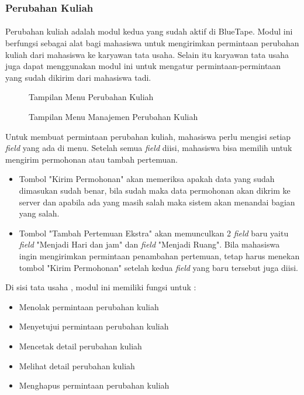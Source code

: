 \subsubsection{Perubahan Kuliah}
\paragraph{} Perubahan kuliah adalah modul kedua yang sudah aktif di BlueTape. Modul ini berfungsi sebagai alat bagi mahasiswa untuk mengirimkan permintaan perubahan kuliah dari mahasiswa ke karyawan tata usaha. Selain itu karyawan tata usaha juga dapat menggunakan modul ini untuk mengatur permintaan-permintaan yang sudah dikirim dari mahasiswa tadi. 
\begin{figure} [H]
	\centering  
	\caption[Tampilan Menu Perubahan Kuliah]{Tampilan Menu Perubahan Kuliah} 
	\label{fig:flow-chart-CodeIgniter} 
\end{figure}
\begin{figure} [H]
	\centering  
	\caption[Tampilan Menu Manajemen Perubahan Kuliah]{Tampilan Menu Manajemen Perubahan Kuliah} 
	\label{fig:flow-chart-CodeIgniter} 
\end{figure}
Untuk membuat permintaan perubahan kuliah, mahasiswa perlu mengisi setiap \textit{field} yang ada di menu. Setelah semua \textit{field} diisi, mahasiswa bisa memilih untuk mengirim permohonan atau tambah pertemuan.
\begin{itemize}
	\item Tombol "Kirim Permohonan" akan memeriksa apakah data yang sudah dimasukan sudah benar, bila sudah maka data permohonan akan dikrim ke server dan apabila ada yang masih salah maka sistem akan menandai bagian yang salah.
	
	\item Tombol "Tambah Pertemuan Ekstra" akan memunculkan 2 \textit{field} baru yaitu \textit{field} "Menjadi Hari dan jam" dan \textit{field} "Menjadi Ruang". Bila mahasiswa ingin mengirimkan permintaan penambahan pertemuan, tetap harus menekan tombol "Kirim Permohonan" setelah kedua \textit{field} yang baru tersebut juga diisi.
\end{itemize}
Di sisi tata usaha , modul ini memiliki fungsi untuk :
\begin{itemize}
	\item Menolak permintaan perubahan kuliah
	\item Menyetujui permintaan perubahan kuliah
	\item Mencetak detail perubahan kuliah
	\item Melihat detail perubahan kuliah
	\item Menghapus permintaan perubahan kuliah
\end{itemize}
  
